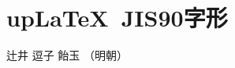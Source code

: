 \documentclass[uplatex]{jsarticle}
\begin{document}
\section{up\LaTeX~JIS90字形}

辻井 逗子 飴玉 （明朝）

\end{document}
